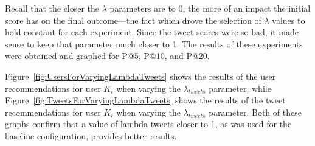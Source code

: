 Recall that the closer the $\lambda$ parameters are to 0, the more of an impact the initial score has on the final outcome---the fact which drove the selection of $\lambda$ values to hold constant for each experiment. Since the tweet scores were so bad, it made sense to keep that parameter much closer to 1. The results of these experiments were obtained and graphed for P@5, P@10, and P@20.

Figure~\ref{fig:UsersForVaryingLambdaTweets} shows the results of the user recommendations for user $K_{i}$ when varying the $\lambda_{tweets}$ parameter, while Figure~\ref{fig:TweetsForVaryingLambdaTweets} shows the results of the tweet recommendations for user $K_{i}$ when varying the $\lambda_{tweets}$ parameter. Both of these graphs confirm that a value of lambda tweets closer to 1, as was used for the baseline configuration, provides better results.







